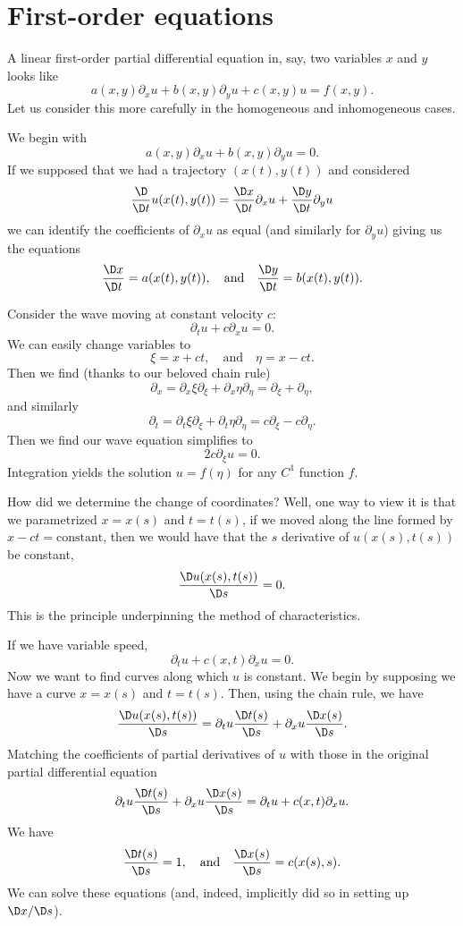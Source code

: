
\section{First-order equations}


\begin{node}\label{pde-0002}%
A linear first-order partial differential equation in, say, two
variables $x$ and $y$ looks like
\[a(x,y)\partial_{x}u+b(x,y)\partial_{y}u+c(x,y)u=f(x,y).\]
Let us consider this more carefully in the homogeneous and inhomogeneous
cases.

\begin{node}[Homogeneous]\label{pde-0003}%
We begin with
\[a(x,y)\partial_{x}u+b(x,y)\partial_{y}u=0.\]
If we supposed that we had a trajectory $(x(t),y(t))$ and considered
\[\frac{\D}{\D t}u(x(t),y(t))=\frac{\D x}{\D t}\partial_{x}u+\frac{\D y}{\D t}\partial_{y}u\]
we can identify the coefficients of $\partial_{x}u$ as equal (and
similarly for $\partial_{y}u$) giving us the equations
\[\frac{\D x}{\D t}=a(x(t),y(t)),\quad\mbox{and}\quad\frac{\D y}{\D t}=b(x(t),y(t)).\]

\begin{example}\label{pde-0005}%
Consider the wave moving at constant velocity $c$:
\[\partial_{t}u+c\partial_{x}u=0.\]
We can easily change variables to
\[\xi=x+ct,\quad\mbox{and}\quad\eta=x-ct.\]
Then we find (thanks to our beloved chain rule)
\[\partial_{x}=\partial_{x}\xi\partial_{\xi}+\partial_{x}\eta\partial_{\eta}=\partial_{\xi}+\partial_{\eta},\]
and similarly
\[\partial_{t}=\partial_{t}\xi\partial_{\xi}+\partial_{t}\eta\partial_{\eta}=c\partial_{\xi}-c\partial_{\eta}.\]
Then we find our wave equation simplifies to
\[2c\partial_{\xi}u=0.\]
Integration yields the solution $u=f(\eta)$ for any $C^{1}$ function $f$.

How did we determine the change of coordinates? Well, one way to view it
is that we parametrized $x=x(s)$ and $t=t(s)$, if we moved along the
line formed by $x-ct=\mbox{constant}$, then we would have that the
$s$ derivative of $u(x(s),t(s))$ be constant,
\[\frac{\D u(x(s),t(s))}{\D s}=0.\]
This is the principle underpinning the method of characteristics.
\end{example}

\begin{example}\label{pde-0006}%
If we have variable speed,
\[\partial_{t}u+c(x,t)\partial_{x}u=0.\]
Now we want to find curves along which $u$ is constant. We begin by
supposing we have a curve $x=x(s)$ and $t=t(s)$. Then, using the chain
rule, we have
\[\frac{\D u(x(s),t(s))}{\D s}=\partial_{t}u\frac{\D t(s)}{\D s} + \partial_{x}u\frac{\D x(s)}{\D s}.\]
Matching the coefficients of partial derivatives of $u$ with those in
the original partial differential equation
\[\partial_{t}u\frac{\D t(s)}{\D s} + \partial_{x}u\frac{\D x(s)}{\D s} =\partial_{t}u+c(x,t)\partial_{x}u.\]
We have
\[\frac{\D t(s)}{\D s}=1,\quad\mbox{and}\quad\frac{\D x(s)}{\D s}=c(x(s),s).\]
We can solve these equations (and, indeed, implicitly did so in setting
up $\D x/\D s$).
\end{example}


\end{node}
\end{node}

